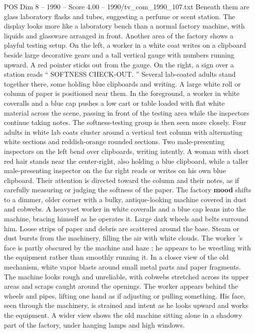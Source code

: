 \begin{textsample}{POS Dim 8 – 1990 – Score 4.00 – 1990/tv\_com\_1990\_107.txt}
Beneath them are glass laboratory flasks and tubes, suggesting a perfume or scent station.
The display looks more like a laboratory bench than a normal factory machine, with liquids and glassware arranged in front.
Another area of the factory shows a playful testing setup.
On the left, a worker in a white coat writes on a clipboard beside large decorative gears and a tall vertical gauge with numbers running upward.
A red pointer sticks out from the gauge.
On the right, a sign over a station reads “ SOFTNESS CHECK-OUT. ” Several lab-coated adults stand together there, some holding blue clipboards and writing.
A large white roll or column of paper is positioned near them.
In the foreground, a worker in white coveralls and a blue cap pushes a low cart or table loaded with flat white material across the scene, passing in front of the testing area while the inspectors continue taking notes.
The softness-testing group is then seen more closely.
Four adults in white lab coats cluster around a vertical test column with alternating white sections and reddish-orange rounded sections.
Two male-presenting inspectors on the left bend over clipboards, writing intently.
A woman with short red hair stands near the center-right, also holding a blue clipboard, while a taller male-presenting inspector on the far right reads or writes on his own blue clipboard.
Their attention is directed toward the column and their notes, as if carefully measuring or judging the softness of the paper.
The factory \textbf{mood} shifts to a dimmer, older corner with a bulky, antique-looking machine covered in dust and cobwebs.
A heavyset worker in white coveralls and a blue cap leans into the machine, bracing himself as he operates it.
Large dark wheels and belts surround him.
Loose strips of paper and debris are scattered around the base.
Steam or dust bursts from the machinery, filling the air with white clouds.
The worker ’s face is partly obscured by the machine and haze ; he appears to be wrestling with the equipment rather than smoothly running it.
In a closer view of the old mechanism, white vapor blasts around small metal parts and paper fragments.
The machine looks rough and unreliable, with cobwebs stretched across its upper areas and scraps caught around the openings.
The worker appears behind the wheels and pipes, lifting one hand as if adjusting or pulling something.
His face, seen through the machinery, is strained and intent as he looks upward and works the equipment.
A wider view shows the old machine sitting alone in a shadowy part of the factory, under hanging lamps and high windows.

\end{textsample}

